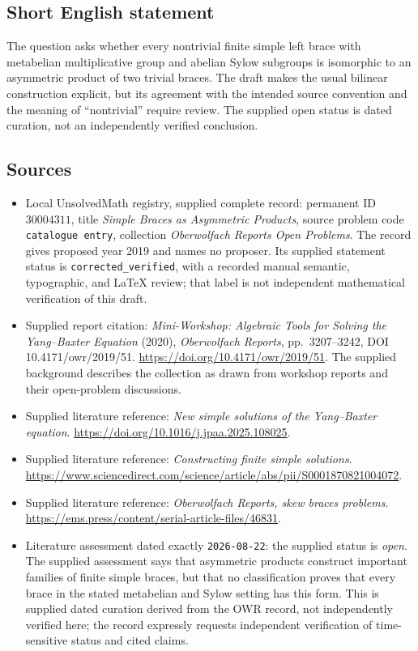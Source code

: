 \documentclass[11pt]{article}
\begin{document}
\subsection{Short English statement}
The question asks whether every nontrivial finite simple left brace with metabelian multiplicative group and abelian Sylow subgroups is isomorphic to an asymmetric product of two trivial braces. The draft makes the usual bilinear construction explicit, but its agreement with the intended source convention and the meaning of ``nontrivial'' require review. The supplied open status is dated curation, not an independently verified conclusion.
\subsection{Sources}
\begin{itemize}
\item Local UnsolvedMath registry, supplied complete record: permanent ID \(30004311\), title \emph{Simple Braces as Asymmetric Products}, source problem code \texttt{catalogue entry}, collection \emph{Oberwolfach Reports Open Problems}. The record gives proposed year 2019 and names no proposer. Its supplied statement status is \texttt{corrected\_verified}, with a recorded manual semantic, typographic, and LaTeX review; that label is not independent mathematical verification of this draft.
\item Supplied report citation: \emph{Mini-Workshop: Algebraic Tools for Solving the Yang--Baxter Equation} (2020), \emph{Oberwolfach Reports}, pp.\ 3207--3242, DOI 10.4171/owr/2019/51. \url{https://doi.org/10.4171/owr/2019/51}. The supplied background describes the collection as drawn from workshop reports and their open-problem discussions.
\item Supplied literature reference: \emph{New simple solutions of the Yang--Baxter equation}. \url{https://doi.org/10.1016/j.jpaa.2025.108025}.
\item Supplied literature reference: \emph{Constructing finite simple solutions}. \url{https://www.sciencedirect.com/science/article/abs/pii/S0001870821004072}.
\item Supplied literature reference: \emph{Oberwolfach Reports, skew braces problems}. \url{https://ems.press/content/serial-article-files/46831}.
\item Literature assessment dated exactly \texttt{2026-08-22}: the supplied status is \emph{open}. The supplied assessment says that asymmetric products construct important families of finite simple braces, but that no classification proves that every brace in the stated metabelian and Sylow setting has this form. This is supplied dated curation derived from the OWR record, not independently verified here; the record expressly requests independent verification of time-sensitive status and cited claims.
\end{itemize}
\end{document}
